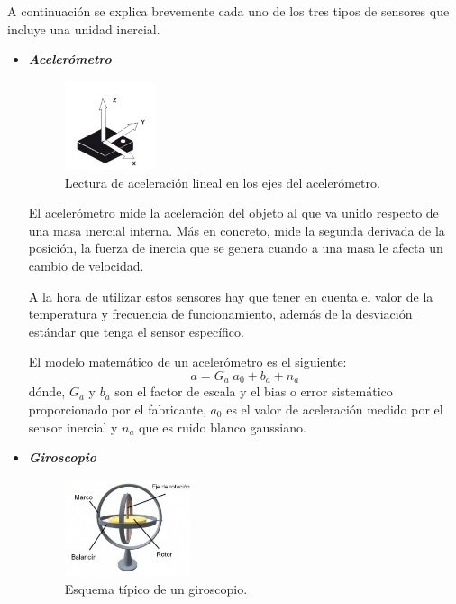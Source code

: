 A continuación se explica brevemente cada uno de los tres tipos de sensores que incluye una unidad inercial. \cite{juanDiego}

\clearpage

	\begin{itemize}
		\item \textit{\textbf{Acelerómetro}}	
		\begin{figure}[H]
			\centering
			\includegraphics[width=0.25\textwidth]{./img/IMUacelerometro}
			\caption{Lectura de aceleración lineal en los ejes del acelerómetro. \cite{juanDiego}} 
			\label{fig:IMUacelerometro}
		\end{figure} 
		
		El acelerómetro mide la aceleración del objeto al que va unido respecto de una masa inercial interna. Más en concreto, mide la segunda derivada de la posición, la fuerza de inercia que se genera cuando a una masa le afecta un cambio de velocidad.
		
		A la hora de utilizar estos sensores hay que tener en cuenta el valor de la temperatura y frecuencia de funcionamiento, además de la desviación estándar que tenga el sensor específico.
		
		El modelo matemático de un acelerómetro es el siguiente:
		\begin{equation}
			\label{eq:modeloAcelera}
			a = G_{a}\; a_{0} + b_{a} + n_{a}
		\end{equation}
		dónde, $ G_{a} $ y $ b_{a} $ son el factor de escala y el bias o error sistemático proporcionado por el fabricante, $ a_{0} $ es el valor de aceleración medido por el sensor inercial y $ n_{a} $ que es ruido blanco gaussiano.
		
	
	\clearpage
	
		\item \textit{\textbf{Giroscopio}}	
		
		\begin{figure}[H]
			\centering
			\includegraphics[width=0.35\textwidth]{./img/IMUgiroscopo}
			\caption{Esquema típico de un giroscopio. \cite{juanDiego}} 
			\label{fig:IMUgiroscopo}
		\end{figure} 
		

\end{itemize}
